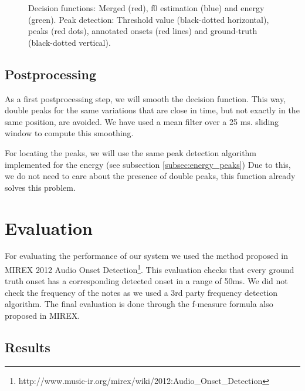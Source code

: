 \documentclass{article}
\begin{document}
\begin{figure}
 \centerline{}
 \caption{Decision functions: Merged (red), f0 estimation (blue) and energy (green). Peak detection: Threshold value (black-dotted horizontal), peaks (red dots), annotated onsets (red lines) and ground-truth (black-dotted vertical).}
 \label{fig:mixcoef}
\end{figure} 

\subsection{Postprocessing}\label{subsec:mix_postpro}

As a first postprocessing step, we will smooth the decision function. This way, double peaks for the same variations that are close in time, but not exactly in the same position, are avoided. We have used a mean filter over a 25 ms. sliding window to compute this smoothing. 

For locating the peaks, we will use the same peak detection algorithm implemented for the energy (see subsection \ref{subsec:energy_peaks})
Due to this, we do not need to care about the presence of double peaks, this function already solves this problem.

\section{Evaluation}\label{sec:eval}

For evaluating the performance of our system we used the method proposed in
MIREX 2012 Audio Onset Detection\footnote{http://www.music-ir.org/mirex/wiki/2012:Audio\_Onset\_Detection}.
This evaluation checks that every ground truth onset has a corresponding detected onset in a range of 50ms.
We did not check the frequency of the notes as we used a 3rd party frequency detection algorithm.
The final evaluation is done through the f-measure formula also proposed in MIREX.

\subsection{Results}\label{subsec:results}
\end{document}
